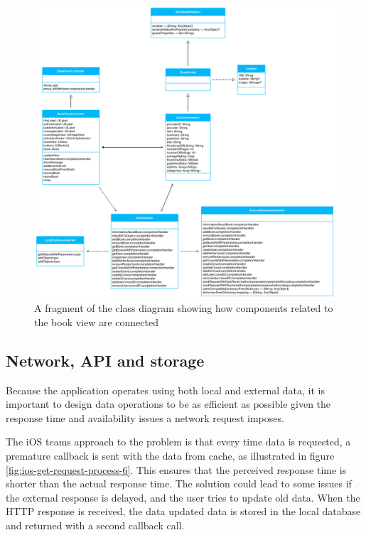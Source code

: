 \begin{figure}
    \includegraphics[width=\textwidth,keepaspectratio,origin=c]{figs/v06/iOS/book-view-class-diagram.png}
    \caption{A fragment of the class diagram showing how components related to the book view are connected}
    \label{fig:ios-book-view-class-diagram-6}
\end{figure}


\subsection{Network, \gls{API} and storage}
Because the application operates using both local and external data, it is important to design data operations to be as efficient as possible given the response time and availability issues a network request imposes. 

The iOS teams approach to the problem is that every time data is requested, a premature callback is sent with the data from cache, as illustrated in figure \ref{fig:ios-get-request-process-6}. This ensures that the perceived response time is shorter than the actual response time. The solution could lead to some issues if the external response is delayed, and the user tries to update old data. When the \gls{HTTP} response is received, the data updated data is stored in the local database and returned with a second callback call.


